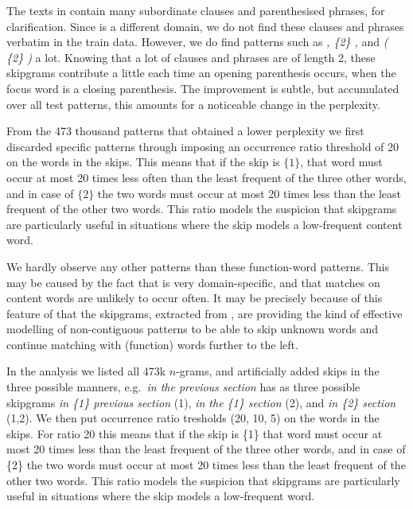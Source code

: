 The texts in \emea contain many subordinate clauses and parenthesised phrases, for clarification. Since \obw is a different domain, we do not find these clauses and phrases verbatim in the train data. However, we do find patterns such as \emph{, \{2\} ,} and \emph{( \{2\} )} a lot. Knowing that a lot of clauses and phrases are of length 2, these skipgrams contribute a little each time an opening parenthesis occurs, when the focus word is a closing parenthesis. The improvement is subtle, but accumulated over all test patterns, this amounts for a noticeable change in the perplexity.

From the 473 thousand patterns that obtained a lower perplexity we first discarded specific patterns through imposing an occurrence ratio threshold of 20 on the words in the skips. This means that if the skip is $\{1\}$, that word must occur at most 20 times less often than the least frequent of the three other words, and in case of $\{2\}$ the two words must occur at most 20 times less than the least frequent of the other two words. This ratio models the suspicion that skipgrams are particularly useful in situations where the skip models a low-frequent content word. 

We hardly observe any other patterns than these function-word patterns. 
This may be caused by the fact that \emea is very domain-specific, and that matches on content words are unlikely to occur often. It may be precisely because of this feature of \emea that the skipgrams, extracted from \obw, are providing the kind of effective modelling of non-contiguous patterns to be able to skip unknown words and continue matching with (function) words further to the left.

In the analysis we listed all 473k $n$-grams, and artificially added skips in the three possible manners, e.g.~\emph{in the previous section} has as three possible skipgrams \emph{in \{1\} previous section} (1), \emph{in the \{1\} section} (2), and \emph{in \{2\} section} (1,2). We then put occurrence ratio tresholds (20, 10, 5) on the words in the skips. For ratio 20 this means that if the skip is \{1\} that word must occur at most 20 times less than the least frequent of the three other words, and in case of \{2\} the two words must occur at most 20 times less than the least frequent of the other two words. This ratio models the suspicion that skipgrams are particularly useful in situations where the skip models a low-frequent word. 

